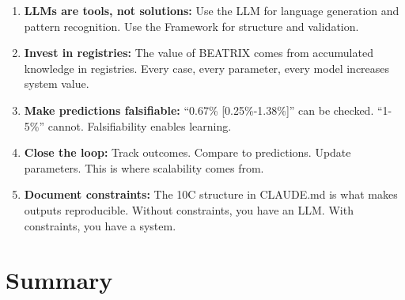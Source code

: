 \begin{tcolorbox}[colback=green!5!white, colframe=green!75!black,
    title=Practical Implications]
\begin{enumerate}
\item \textbf{LLMs are tools, not solutions:} Use the LLM for language generation and pattern recognition. Use the Framework for structure and validation.

\item \textbf{Invest in registries:} The value of BEATRIX comes from accumulated knowledge in registries. Every case, every parameter, every model increases system value.

\item \textbf{Make predictions falsifiable:} ``0.67\% [0.25\%-1.38\%]'' can be checked. ``1-5\%'' cannot. Falsifiability enables learning.

\item \textbf{Close the loop:} Track outcomes. Compare to predictions. Update parameters. This is where scalability comes from.

\item \textbf{Document constraints:} The 10C structure in CLAUDE.md is what makes outputs reproducible. Without constraints, you have an LLM. With constraints, you have a system.
\end{enumerate}
\end{tcolorbox}


\section{Summary}
\label{sec:bx-summary}

